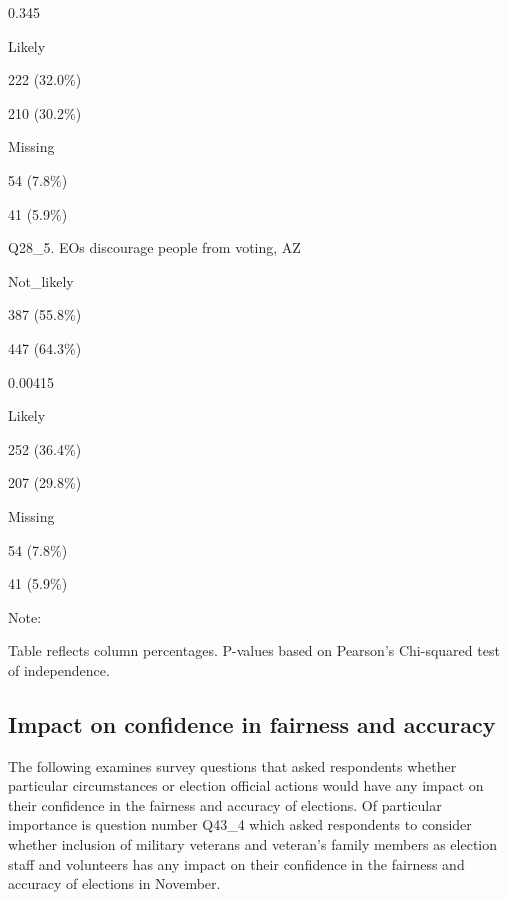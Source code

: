 \documentclass[
  11pt,
  a4paper,
]{article}
\begin{document}
\begin{table}
{0.345

Likely

222 (32.0\%)

210 (30.2\%)

Missing

54 (7.8\%)

41 (5.9\%)

Q28\_5. EOs discourage people from voting, AZ

Not\_likely

387 (55.8\%)

447 (64.3\%)

0.00415

Likely

252 (36.4\%)

207 (29.8\%)

Missing

54 (7.8\%)

41 (5.9\%)

{Note: }

Table reflects column percentages. P-values based on Pearson's
Chi-squared test of independence.

}

\end{table}%

\subsection{Impact on confidence in fairness and
accuracy}\label{impact-on-confidence-in-fairness-and-accuracy}

The following examines survey questions that asked respondents whether
particular circumstances or election official actions would have any
impact on their confidence in the fairness and accuracy of elections. Of
particular importance is question number Q43\_4 which asked respondents
to consider whether inclusion of military veterans and veteran's family
members as election staff and volunteers has any impact on their
confidence in the fairness and accuracy of elections in November.
\end{document}
